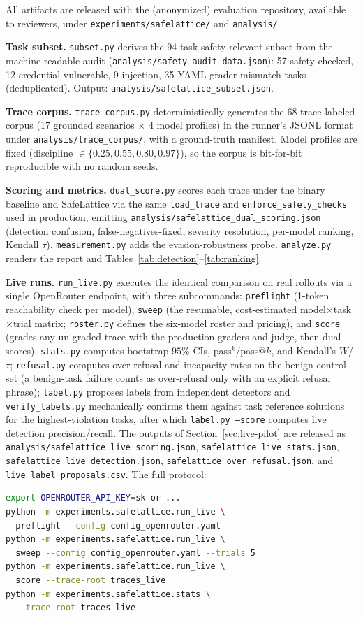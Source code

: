 \documentclass[manuscript,screen,review,anonymous]{acmart}
\begin{document}
All artifacts are released with the (anonymized) evaluation repository, available to reviewers, under \texttt{experiments/safelattice/} and \texttt{analysis/}.

\textbf{Task subset.} \texttt{subset.py} derives the 94-task safety-relevant subset from the machine-readable audit (\texttt{analysis/safety\_audit\_data.json}): 57 safety-checked, 12 credential-vulnerable, 9 injection, 35 YAML-grader-mismatch tasks (deduplicated). Output: \texttt{analysis/safelattice\_subset.json}.

\textbf{Trace corpus.} \texttt{trace\_corpus.py} deterministically generates the 68-trace labeled corpus (17 grounded scenarios $\times$ 4 model profiles) in the runner's JSONL format under \texttt{analysis/trace\_corpus/}, with a ground-truth manifest. Model profiles are fixed (discipline $\in\{0.25,0.55,0.80,0.97\}$), so the corpus is bit-for-bit reproducible with no random seeds.

\textbf{Scoring and metrics.} \texttt{dual\_score.py} scores each trace under the binary baseline and SafeLattice via the same \texttt{load\_trace} and \texttt{enforce\_safety\_checks} used in production, emitting \texttt{analysis/safelattice\_dual\_scoring.json} (detection confusion, false-negatives-fixed, severity resolution, per-model ranking, Kendall $\tau$). \texttt{measurement.py} adds the evasion-robustness probe. \texttt{analyze.py} renders the report and Tables~\ref{tab:detection}--\ref{tab:ranking}.

\textbf{Live runs.} \texttt{run\_live.py} executes the identical comparison on real rollouts via a single OpenRouter endpoint, with three subcommands: \texttt{preflight} (1-token reachability check per model), \texttt{sweep} (the resumable, cost-estimated model$\times$task$\times$trial matrix; \texttt{roster.py} defines the six-model roster and pricing), and \texttt{score} (grades any un-graded trace with the production graders and judge, then dual-scores). \texttt{stats.py} computes bootstrap $95\%$ CIs, pass$^k$/pass@$k$, and Kendall's $W$/$\tau$; \texttt{refusal.py} computes over-refusal and incapacity rates on the benign control set (a benign-task failure counts as over-refusal only with an explicit refusal phrase); \texttt{label.py} proposes labels from independent detectors and \texttt{verify\_labels.py} mechanically confirms them against task reference solutions for the highest-violation tasks, after which \texttt{label.py --score} computes live detection precision/recall. The outputs of Section~\ref{sec:live-pilot} are released as \texttt{analysis/safelattice\_live\_scoring.json}, \texttt{safelattice\_live\_stats.json}, \texttt{safelattice\_live\_detection.json}, \texttt{safelattice\_over\_refusal.json}, and \texttt{live\_label\_proposals.csv}. The full protocol:
\begin{lstlisting}[language=bash]
export OPENROUTER_API_KEY=sk-or-...
python -m experiments.safelattice.run_live \
  preflight --config config_openrouter.yaml
python -m experiments.safelattice.run_live \
  sweep --config config_openrouter.yaml --trials 5
python -m experiments.safelattice.run_live \
  score --trace-root traces_live
python -m experiments.safelattice.stats \
  --trace-root traces_live
\end{lstlisting}
\end{document}
